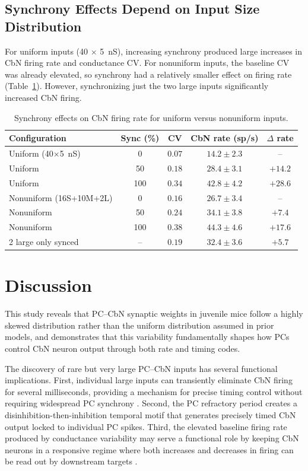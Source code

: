 \documentclass[11pt]{article}
\begin{document}
\subsection{Synchrony Effects Depend on Input Size Distribution}

For uniform inputs (40 $\times$ 5~nS), increasing synchrony produced large increases in CbN firing rate and conductance CV. For nonuniform inputs, the baseline CV was already elevated, so synchrony had a relatively smaller effect on firing rate (Table~\ref{tab:synchrony}). However, synchronizing just the two large inputs significantly increased CbN firing.

\begin{table}[H]
\centering
\caption{Synchrony effects on CbN firing rate for uniform versus nonuniform inputs.}
\label{tab:synchrony}
\begin{tabular}{lcccc}
\toprule
\textbf{Configuration} & \textbf{Sync (\%)} & \textbf{CV} & \textbf{CbN rate (sp/s)} & \textbf{$\Delta$ rate} \\
\midrule
Uniform (40$\times$5~nS) & 0 & $0.07$ & $14.2 \pm 2.3$ & -- \\
Uniform & 50 & $0.18$ & $28.4 \pm 3.1$ & $+14.2$ \\
Uniform & 100 & $0.34$ & $42.8 \pm 4.2$ & $+28.6$ \\
Nonuniform (16S+10M+2L) & 0 & $0.16$ & $26.7 \pm 3.4$ & -- \\
Nonuniform & 50 & $0.24$ & $34.1 \pm 3.8$ & $+7.4$ \\
Nonuniform & 100 & $0.38$ & $44.3 \pm 4.6$ & $+17.6$ \\
2 large only synced & -- & $0.19$ & $32.4 \pm 3.6$ & $+5.7$ \\
\bottomrule
\end{tabular}
\end{table}

\section{Discussion}

This study reveals that PC--CbN synaptic weights in juvenile mice follow a highly skewed distribution rather than the uniform distribution assumed in prior models, and demonstrates that this variability fundamentally shapes how PCs control CbN neuron output through both rate and timing codes.

The discovery of rare but very large PC--CbN inputs has several functional implications. First, individual large inputs can transiently eliminate CbN firing for several milliseconds, providing a mechanism for precise timing control without requiring widespread PC synchrony \citep{person2012purkinje}. Second, the PC refractory period creates a disinhibition-then-inhibition temporal motif that generates precisely timed CbN output locked to individual PC spikes. Third, the elevated baseline firing rate produced by conductance variability may serve a functional role by keeping CbN neurons in a responsive regime where both increases and decreases in firing can be read out by downstream targets \citep{gauck2000role}.
\end{document}
